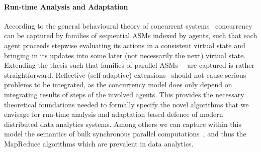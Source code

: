 \documentclass[a4paper,11pt]{article}
\newcommand{\project}[1]{\textbf{#1}\xspace}
\newcommand{\SECURITY}{\project{Elysian}}
\newcommand{\TheProject}{\SECURITY}
\begin{document}



\paragraph{Run-time Analysis and Adaptation}
According to the general behavioural theory of concurrent systems~\cite{BorgerS16} concurrency can be captured by families of sequential ASMs indexed by agents, such that each agent proceeds stepwise evaluating its actions in a consistent virtual state and bringing in its updates into some later (not necessarily the next) virtual state. Extending the thesis such that families of parallel ASMs~\cite{FerrarottiSTW16}  are captured is rather straightforward. Reflective (self-adaptive) extensions~\cite{abs-2001-01873} should not cause serious problems to be integrated, as the concurrency model does only depend on integrating results of steps of the involved agents. This provides the necessary theoretical foundations  needed to formally specify the novel algorithms that we envisage for run-time analysis and adaptation based defence of modern distributed data analytics systems. Among others we can capture within this model the semantics of bulk synchronous parallel computations~\cite{FerrarottiGS19}, and thus the MapReduce algorithms which are prevalent in data analytics. 
\end{document}
